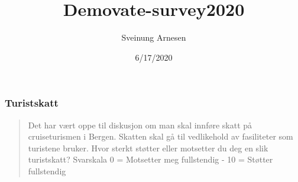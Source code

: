 \documentclass[
]{article}
\title{Demovate-survey2020}
\author{Sveinung Arnesen}
\date{6/17/2020}
\begin{document}
\maketitle

\hypertarget{turistskatt}{%
\subsubsection{Turistskatt}\label{turistskatt}}

\begin{quote}
Det har vært oppe til diskusjon om man skal innføre skatt på
cruiseturismen i Bergen. Skatten skal gå til vedlikehold av fasiliteter
som turistene bruker. Hvor sterkt støtter eller motsetter du deg en slik
turistskatt? Svarskala 0 = Motsetter meg fullstendig - 10 = Støtter
fullstendig
\end{quote}
\end{document}
